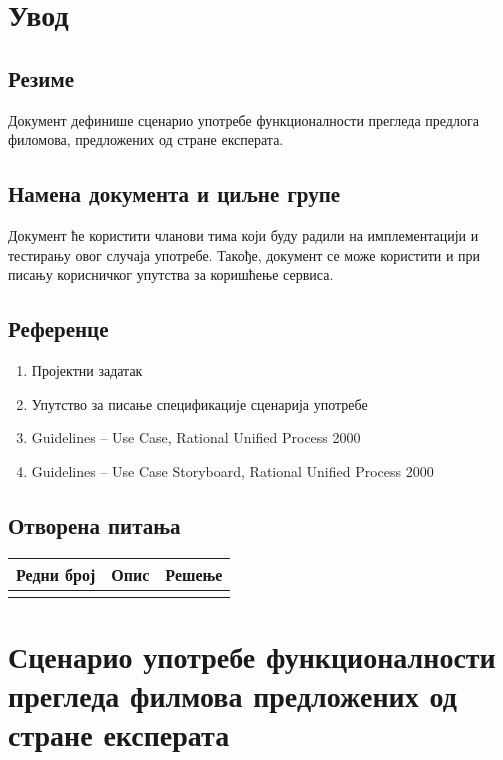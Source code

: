 \section{Увод}

\subsection{Резиме}

Документ дефинише сценарио употребе функционалности прегледа предлога филомова, предложених од стране експерата.

\subsection{Намена документа и циљне групе}

Документ ће користити чланови тима који буду радили на имплементацији и тестирању овог случаја
употребе. Такође, документ се може користити и при писању корисничког упутства за коришћење
сервиса.

\subsection{Референце}

\begin{enumerate}
    \item Пројектни задатак
    \item Упутство за писање спецификације сценарија употребе
    \item Guidelines – Use Case, Rational Unified Process 2000
    \item Guidelines – Use Case Storyboard, Rational Unified Process 2000
\end{enumerate}

\subsection{Отворена питања}

\noindent
\setcellgapes{4pt}
\makegapedcells
\begin{tabularx}{\linewidth}{|l|X|X|}
    \hline
    \textbf{Редни број} & \textbf{Опис} & \textbf{Решење} \\
    \hline
    & & \\
    \hline
\end{tabularx}

\section{Сценарио употребе функционалности прегледа филмова предложених од стране експерата}

